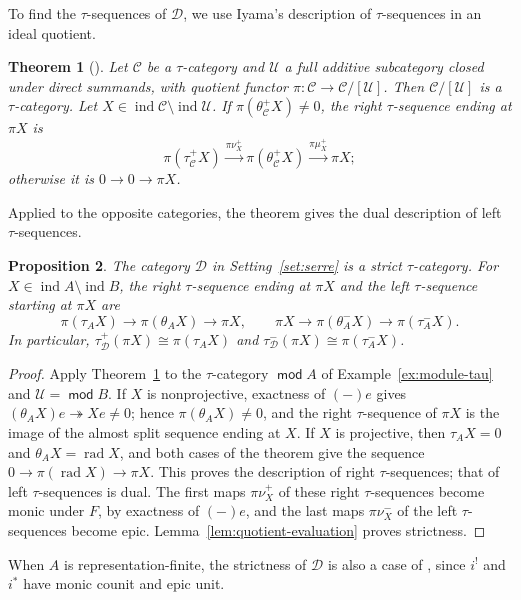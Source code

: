 \documentclass[a4paper,reqno,10pt]{amsart}
\newtheorem{theorem}{Theorem}[section]
\newtheorem{proposition}[theorem]{Proposition}
\theoremstyle{definition}
\numberwithin{equation}{section}
\DeclareMathOperator{\moduleCategory}{\mathsf{mod}}
\renewcommand{\mod}{\moduleCategory}
\DeclareMathOperator{\ind}{ind}
\DeclareMathOperator{\rad}{rad}
\newcommand{\cC}{\mathcal C}
\newcommand{\cD}{\mathcal D}
\begin{document}
To find the \(\tau\)-sequences of \(\cD\), we use Iyama's description of
\(\tau\)-sequences in an ideal quotient.
\begin{theorem}[{\cite[Section~1.4(2)]{IyamaII}}]\label{thm:iyama-quotient}
Let \(\cC\) be a \(\tau\)-category and \(\mathcal U\) a full
additive subcategory closed under direct summands, with quotient functor
\(\pi:\cC\to\cC/[\mathcal U]\). Then
\(\cC/[\mathcal U]\) is a \(\tau\)-category. Let
\(X\in\ind\cC\setminus\ind\mathcal U\). If
\(\pi(\theta_{\cC}^+X)\ne0\), the right \(\tau\)-sequence ending at
\(\pi X\) is
\[
 \pi(\tau_{\cC}^+X)\xrightarrow{\pi\nu_X^+}\pi(\theta_{\cC}^+X)
 \xrightarrow{\pi\mu_X^+}\pi X;
\]
otherwise it is \(0\to0\to\pi X\).
\end{theorem}
Applied to the opposite categories, the theorem gives the dual description
of left \(\tau\)-sequences.

\begin{proposition}\label{prop:quotient-sequences}
The category \(\cD\) in Setting~\ref{set:serre} is a strict
\(\tau\)-category. For \(X\in\ind A\setminus\ind B\), the right
\(\tau\)-sequence ending at \(\pi X\) and the left \(\tau\)-sequence
starting at \(\pi X\) are
\[
 \pi(\tau_A X)\longrightarrow\pi(\theta_A X)\longrightarrow\pi X,
 \qquad
 \pi X\longrightarrow\pi(\theta_A^-X)\longrightarrow\pi(\tau_A^-X).
\]
In particular, \(\tau_{\cD}^+(\pi X)\cong\pi(\tau_A X)\) and
\(\tau_{\cD}^-(\pi X)\cong\pi(\tau_A^-X)\).
\end{proposition}
\begin{proof}
Apply Theorem~\ref{thm:iyama-quotient} to the \(\tau\)-category
\(\mod A\) of Example~\ref{ex:module-tau} and \(\mathcal U=\mod B\).
If \(X\) is nonprojective, exactness of \((-)e\) gives
\((\theta_A X)e\twoheadrightarrow Xe\ne0\); hence
\(\pi(\theta_A X)\ne0\), and the right \(\tau\)-sequence of \(\pi X\) is
the image of the almost split sequence ending at \(X\). If \(X\) is
projective, then \(\tau_A X=0\) and \(\theta_A X=\rad X\), and both
cases of the theorem give the sequence \(0\to\pi(\rad X)\to\pi X\). This proves the
description of right \(\tau\)-sequences; that of left \(\tau\)-sequences
is dual.
The first maps \(\pi\nu_X^+\) of these right \(\tau\)-sequences become
monic under \(F\), by exactness of \((-)e\), and the last maps
\(\pi\nu_X^-\) of the left \(\tau\)-sequences become epic.
Lemma~\ref{lem:quotient-evaluation} proves strictness.
\end{proof}
When \(A\) is representation-finite, the strictness of \(\cD\) is also
a case of \cite[Theorem~6.1]{IyamaII}, since \(i^!\) and \(i^*\) have
monic counit and epic unit.
\end{document}
